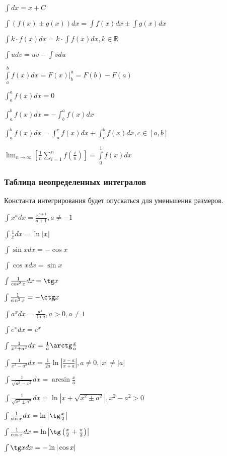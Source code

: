 $ \int dx = x + C $

$ \int (f(x) \pm g(x)) dx = \int f(x) dx \pm \int g(x) dx $

$ \int k\cdot f(x) dx = k\cdot \int f(x) dx, k \in \mathbb{R} $

$ \int u dv = uv - \int v du $

$ \int\limits_a^b f(x) dx = \left.F(x)\right|_b^a = F(b) - F(a) $

$ \int_a^a f(x) dx = 0 $

$ \int_a^b f(x) dx = -\int_b^a f(x) dx $

$ \int_a^b f(x) dx = \int_a^c f(x) dx + \int_c^b f(x) dx, c \in [a, b] $

$\displaystyle \lim_{n \to \infty} \left[ \frac{1}{n} \sum_{i = 1}^{n} f\left(\frac{i}{n}\right) \right] = \int\limits_0^1 f(x) dx $

\subsubsection{Таблица неопределенных интегралов}

Константа интегрирования будет опускаться для уменьшения размеров.

$ \int x^a dx = \frac{x^{a+1}}{a+1}, a \neq -1 $

$ \int \frac{1}{x} dx = \ln|x| $

$ \int \sin x dx = -\cos x $

$ \int \cos x dx = \sin x $

$ \int \frac{1}{\cos^2 x} dx = \tg x $

$ \int \frac{1}{\sin^2 x} = -\ctg x $

$ \int a^x dx = \frac{a^x}{\ln a}, a>0, a \neq 1 $

$ \int e^x dx = e^x $

$ \int \frac{1}{x^2 + a^2} dx = \frac{1}{a} \arctg\frac{x}{a} $

$ \int \frac{1}{x^2 - a^2} dx = \frac{1}{2a} \ln\left|\frac{x-a}{x+a}\right|, a \neq 0, |x| \neq |a| $

$ \int \frac{1}{\sqrt{a^2-x^2}} dx = \arcsin\frac{x}{a} $

$ \int \frac{1}{\sqrt{x^2\pm a^2}} dx = \ln\left|x+\sqrt{x^2\pm a^2}\right|, x^2-a^2 > 0 $

$ \int \frac{1}{\sin x} dx = \ln\left|\tg\frac{x}{2}\right| $

$ \int \frac{1}{\cos x} dx = \ln\left|\tg\left(\frac{x}{2} + \frac{\pi}{2}\right)\right| $

$ \int \tg x dx = -\ln|\cos x| $

